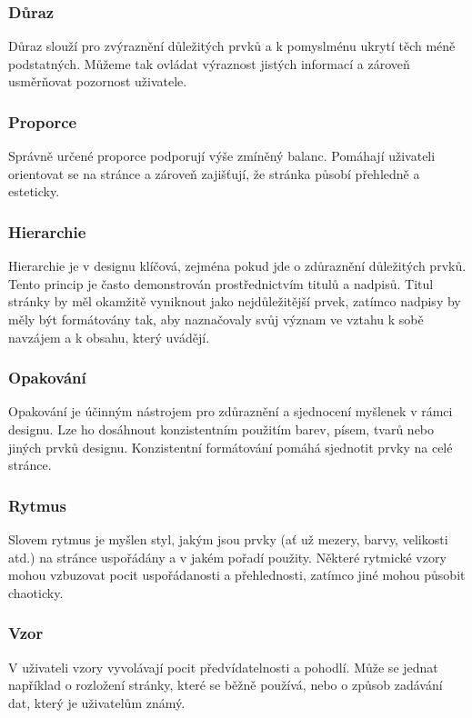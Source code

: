 \subsubsection*{Důraz}
Důraz slouží pro zvýraznění důležitých prvků a k pomyslménu ukrytí těch méně podstatných. Můžeme tak ovládat výraznost jistých informací a zároveň usměrňovat pozornost uživatele.

\subsubsection*{Proporce}
Správně určené proporce podporují výše zmíněný balanc. Pomáhají uživateli orientovat se na stránce a zároveň zajišťují, že stránka působí přehledně a esteticky.

\subsubsection*{Hierarchie}
Hierarchie je v designu klíčová, zejména pokud jde o zdůraznění důležitých prvků. Tento princip je často demonstrován prostřednictvím titulů a nadpisů. Titul stránky by měl okamžitě vyniknout jako nejdůležitější prvek, zatímco nadpisy by měly být formátovány tak, aby naznačovaly svůj význam ve vztahu k sobě navzájem a k obsahu, který uvádějí.

\subsubsection*{Opakování}
Opakování je účinným nástrojem pro zdůraznění a sjednocení myšlenek v rámci designu. Lze ho dosáhnout konzistentním použitím barev, písem, tvarů nebo jiných prvků designu. Konzistentní formátování pomáhá sjednotit prvky na celé stránce.

\subsubsection*{Rytmus}
Slovem rytmus je myšlen styl, jakým jsou prvky (ať už mezery, barvy, velikosti atd.) na stránce uspořádány a v jakém pořadí použity. Některé rytmické vzory mohou vzbuzovat pocit uspořádanosti a přehlednosti, zatímco jiné mohou působit chaoticky.

\subsubsection*{Vzor}
V uživateli vzory vyvolávají pocit předvídatelnosti a pohodlí. Může se jednat například o rozložení stránky, které se běžně používá, nebo o způsob zadávání dat, který je uživatelům známý.

